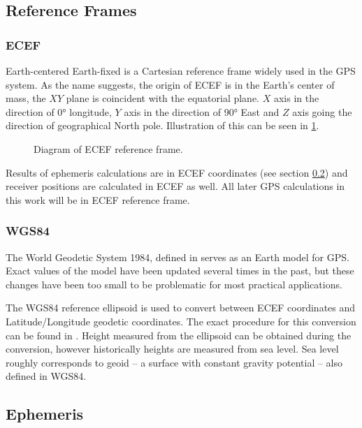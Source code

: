 \subsection{Reference Frames}
\label{sec:ref-frames}

\subsubsection{ECEF}
Earth-centered Earth-fixed is a Cartesian reference frame widely used in the GPS system.
As the name suggests, the origin of ECEF is in the Earth's center of mass, the \(XY\) plane is coincident
with the equatorial plane.
\(X\) axis in the direction of \ang{0} longitude, \(Y\) axis in the direction of \ang{90} East and \(Z\) axis going
the direction of geographical North pole.
Illustration of this can be seen in \cref{fig:ecef}.

\begin{figure}[h]
	\centering
	
	\caption{Diagram of ECEF reference frame.}
	\label{fig:ecef}
\end{figure}

Results of ephemeris calculations are in ECEF coordinates
(see section \ref{sec:gps-ephemeris}) and receiver positions are calculated
in ECEF as well.
All later GPS calculations in this work will be in ECEF reference frame.

\subsubsection{WGS84}
The World Geodetic System 1984, defined in \cite{nima04}
serves as an Earth model for GPS.
Exact values of the model have been updated several times in the past,
but these changes have been too small to be problematic for most practical
applications.

The WGS84 reference ellipsoid is used to convert between ECEF coordinates and
Latitude/Longitude geodetic coordinates.
The exact procedure for this conversion can be found in \cite{nima04}.
Height measured from the ellipsoid can be obtained during the conversion,
however historically heights are measured from sea level.
Sea level roughly corresponds to geoid -- a surface with constant gravity
potential -- also defined in WGS84.



\subsection{Ephemeris}
\label{sec:gps-ephemeris}


